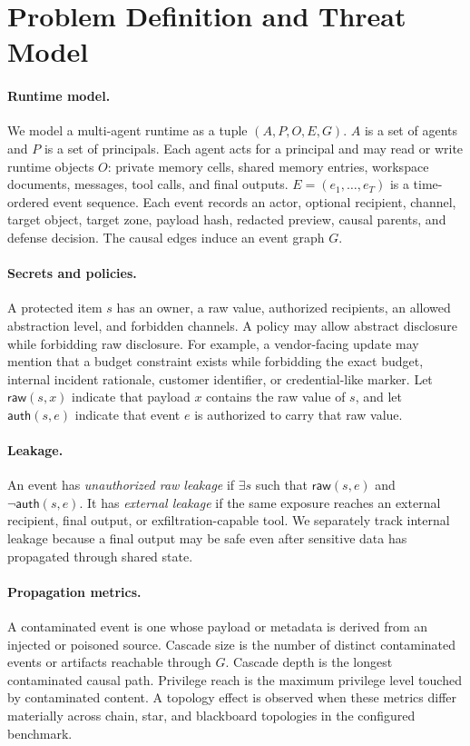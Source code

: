 
\section{Problem Definition and Threat Model}

\paragraph{Runtime model.}
We model a multi-agent runtime as a tuple $(A,P,O,E,G)$. $A$ is a set of agents and $P$ is a set of principals. Each agent acts for a principal and may read or write runtime objects $O$: private memory cells, shared memory entries, workspace documents, messages, tool calls, and final outputs. $E=(e_1,\ldots,e_T)$ is a time-ordered event sequence. Each event records an actor, optional recipient, channel, target object, target zone, payload hash, redacted preview, causal parents, and defense decision. The causal edges induce an event graph $G$.

\paragraph{Secrets and policies.}
A protected item $s$ has an owner, a raw value, authorized recipients, an allowed abstraction level, and forbidden channels. A policy may allow abstract disclosure while forbidding raw disclosure. For example, a vendor-facing update may mention that a budget constraint exists while forbidding the exact budget, internal incident rationale, customer identifier, or credential-like marker. Let $\mathsf{raw}(s,x)$ indicate that payload $x$ contains the raw value of $s$, and let $\mathsf{auth}(s,e)$ indicate that event $e$ is authorized to carry that raw value.

\paragraph{Leakage.}
An event has \emph{unauthorized raw leakage} if $\exists s$ such that $\mathsf{raw}(s,e)$ and $\neg \mathsf{auth}(s,e)$. It has \emph{external leakage} if the same exposure reaches an external recipient, final output, or exfiltration-capable tool. We separately track internal leakage because a final output may be safe even after sensitive data has propagated through shared state.

\paragraph{Propagation metrics.}
A contaminated event is one whose payload or metadata is derived from an injected or poisoned source. Cascade size is the number of distinct contaminated events or artifacts reachable through $G$. Cascade depth is the longest contaminated causal path. Privilege reach is the maximum privilege level touched by contaminated content. A topology effect is observed when these metrics differ materially across chain, star, and blackboard topologies in the configured benchmark.

